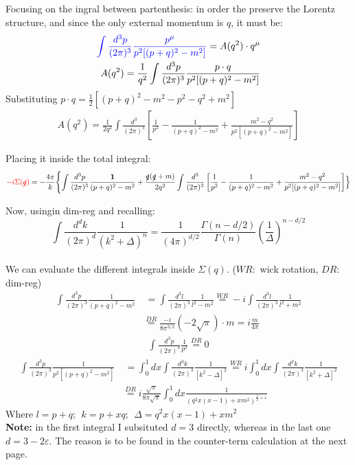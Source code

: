 \documentclass[a4paper,11pt,DIV=12]{scrartcl}
\begin{document}
Focusing on the ingral between partenthesis:
in order the preserve the Lorentz structure, and since the only external momentum is $q$, it must be:
\begin{align*}
    \textcolor{blue}{\int \frac{d^3p}{(2\pi)^3} \frac{p^\mu}{p^2 [(p+q)^2 - m^2]}} = A(q^2)\cdot q^\mu 
    \\
    A(q^2)= \frac{1}{q^2}\int \frac{d^3p}{(2\pi)^3} \frac{p\cdot q}{p^2 [(p+q)^2 - m^2]}
\end{align*}
Substituting $p\cdot q = \frac{1}{2}[(p+q)^2-m^2 - p^2 - q^2 + m^2]$
\begin{align*}
    A(q^2) = \frac{1}{2 q^2} \int \frac{d^3}{(2\pi)^3} \left[ \frac{1}{p^2} - \frac{1}{(p+q)^2-m^2} + \frac{m^2 - q^2}{p^2[(p+q)^2 - m^2]} \right]
\end{align*}

Placing it inside the total integral: 
\begin{align*}
    \textcolor{red} {-i \Sigma(\slashed{q})}=-\frac{4\pi}{k}\Biggl\{ \int \frac{d^3p}{(2\pi)^3} \frac{\mathbf{1}}{(p+q)^2-m^2} + \frac{\slashed{q}(\slashed{q}+m)}{2q^2}\int \frac{d^3}{(2\pi)^3} \left[\frac{1}{p^2} - \frac{1}{(p+q)^2-m^2} + \frac{m^2 - q^2}{p^2[(p+q)^2 - m^2]} \right]  \Bigr\}
\end{align*}

Now, usingin dim-reg and recalling:
$$
\int \frac{d^d k}{(2\pi)^d} \frac{1}{(k^2 + \Delta)^n}
= \frac{1}{(4\pi)^{d/2}} \frac{\Gamma(n - d/2)}{\Gamma(n)}
\left( \frac{1}{\Delta} \right)^{n - d/2}
$$
\\
We can evaluate the different integrals inside $\Sigma(q)$. ($WR:$ wick rotation, $DR:$ dim-reg)
\begin{align*}
    \int \frac{d^3 p}{(2\pi)^3} \frac{1}{(p+q)^2 - m^2}&\ 
= \int \frac{d^3 l}{(2\pi)^3} \frac{1}{l^2 - m^2} \stackrel{WR}{=} -i \int \frac{d^3 l}{(2\pi)^3} \frac{1}{l^2 + m^2} 
\\ &\stackrel{DR}{=}\frac{-i}{8\pi^{3/2}} (-2\sqrt{\pi}) \cdot m = i\frac{m}{4 \pi}
\end{align*}
\begin{align*}
    \int \frac{d^3 p}{(2 \pi)^3} \frac{1}{p^2} \stackrel{DR}{=} 0 
\end{align*}
\begin{align*}
    \int \frac{d^3 p}{(2\pi)^3} \frac{1}{p^2 [(p+q)^2-m^2]}&\ =\int_0^1 dx \int \frac{d^3 k }{(2 \pi)^3}\frac{1}{[k^2-\Delta]^2} \stackrel{WR}{=} i \int_0^1 dx \int \frac{d^3 k }{(2 \pi)^3} \frac{1}{[k^2 + \Delta]^2}
    \\ &\stackrel{DR}{=}i\frac{\sqrt{\pi}}{8 \pi \sqrt{\pi}}\int_0^1 dx \frac{1}{(q^2 x(x-1)+xm^2)^{\frac{1}{2}+\varepsilon}}
\end{align*}
Where $l=p+q;\ \ k=p+xq; \ \ \Delta=q^2 x(x-1)+xm^2$
\\
\textbf{Note:} in the first integral I subsituted $d=3$ directly, whereas in the last one $d=3-2\varepsilon$. The reason is to be found in the counter-term calculation at the next page.
\end{document}
